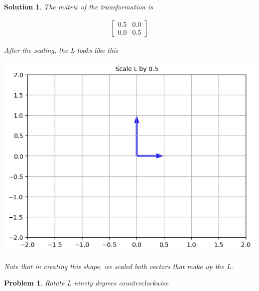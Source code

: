 \documentclass{article}
\newtheorem{problem}{Problem}
\newtheorem*{solution}{Solution}
\begin{document}
\begin{solution}
The matrix of the transformation is 

\begin{align*}
\begin{bmatrix}
0.5 & 0.0 \\ 
0.0 & 0.5
\end{bmatrix}
\end{align*}

After the scaling, the L looks like this

\includegraphics[scale=0.5, center]{Lscalebyhalf} 

Note that in creating this shape, we scaled both vectors that make up the L.

\end{solution}

\begin{problem}
Rotate L ninety degrees counterclockwise
\end{problem}
\end{document}
